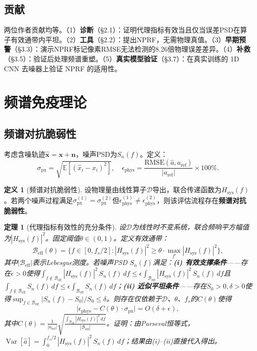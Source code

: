 \documentclass[9pt,twocolumn]{article}
\newtheorem{theorem}[proposition]{定理}
\theoremstyle{remark}
\theoremstyle{definition}
\newtheorem{definition}[proposition]{定义}
\newcommand{\pxrmse}{\sigma_{\text{px}}}
\newcommand{\physerr}{\epsilon_{\text{phys}}}
\newcommand{\snf}{S_n(f)}
\newcommand{\hsysf}{|H_{\text{sys}}(f)|^2}
\newcommand{\Beff}{\mathcal{B}_{\text{eff}}}
\newcommand{\澔}{%
  \hbox{%
    \scalebox{0.75}[1]{氵}%
    \kern -0.3em%
    \scalebox{0.8}[1]{皓}%
  }%
}
\begin{document}
\subsection{贡献}

两位作者贡献均等。（1）\textbf{诊断}（\S 2.1）：证明代理指标有效当且仅当误差PSD在算子有效通带内平坦。（2）\textbf{工具}（\S 2.2）：提出NPRF，无需物理真值。（3）\textbf{早期预警}（\S 3.3）：演示NPRF标记像素RMSE无法检测的8.26倍物理误差差异。（4）\textbf{补救}（\S 3.5）：验证后处理频谱重塑。（5）\textbf{真实模型验证}（\S 3.7）：在真实训练的 1D CNN 去噪器上验证 NPRF 的适用性。

\section{频谱免疫理论}

\subsection{频谱对抗脆弱性}

考虑含噪轨迹$\hat{\mathbf{x}} = \mathbf{x} + \mathbf{n}$，噪声PSD为$\snf$。定义：
\begin{equation}
\label{eq:metrics}
\pxrmse = \sqrt{\mathbb{E}[(\hat{x}_i - x_i)^2]}, \quad \physerr = \frac{\text{RMSE}(\hat{a}, a_{\text{ref}})}{|a_{\text{ref}}|} \times 100\%.
\end{equation}

\begin{definition}[频谱对抗脆弱性]
设物理量由线性算子$\mathcal{D}$导出，联合传递函数为$H_{\text{sys}}(f)$。若两个噪声过程满足$\pxrmse^{(1)}=\pxrmse^{(2)}$但$\physerr^{(1)}\neq\physerr^{(2)}$，则该评估流程存在\textbf{频谱对抗脆弱性}。
\end{definition}

\begin{theorem}[代理指标有效性的充分条件]
\label{thm:sufficiency}
设$\mathcal{D}$为线性时不变系统，联合频响平方幅值为$\hsysf$。固定阈值$\theta \in (0,1)$。定义\textit{有效通带}：
\begin{equation}
\label{eq:band}
\Beff(\theta) = \bigl\{f \in [0, f_s/2] : \hsysf \geq \theta \cdot \max_{f'} \hsysf \bigr\},
\end{equation}
其中$|\Beff|$表示Lebesgue测度。若噪声PSD $\snf$满足：\textbf{(i) 有效支撑条件}——存在$\epsilon>0$使得$\int_{f \notin \Beff} \hsysf \,\snf \, df \leq \epsilon \int_{\Beff} \hsysf \,\snf \, df$且$\int_{f \notin \Beff} \snf \, df \leq \epsilon \int_{\Beff} \snf \, df$；\textbf{(ii) 近似平坦条件}——存在$S_0>0, \delta>0$使得$\sup_{f \in \Beff} |\snf - S_0|/S_0 \leq \delta$。则存在仅依赖于$\mathcal{D}$、$\theta$、$f_s$的$C(\theta)$使得
\begin{equation}
\label{eq:thm_bound}
\bigl|\physerr - C(\theta) \cdot \pxrmse \bigr| = O(\delta + \epsilon),
\end{equation}
其中$C(\theta) = \frac{1}{|a_{\text{ref}}|} \sqrt{\frac{\int_{\Beff} \hsysf \, df}{|\Beff|}}$。\textit{证明：}由Parseval恒等式\cite{brillinger2001}，$\operatorname{Var}[\hat{a}] = \int_{0}^{f_s/2} \hsysf \,\snf \, df$；结果由(i)--(ii)直接代入得出。
\end{theorem}
\end{document}
